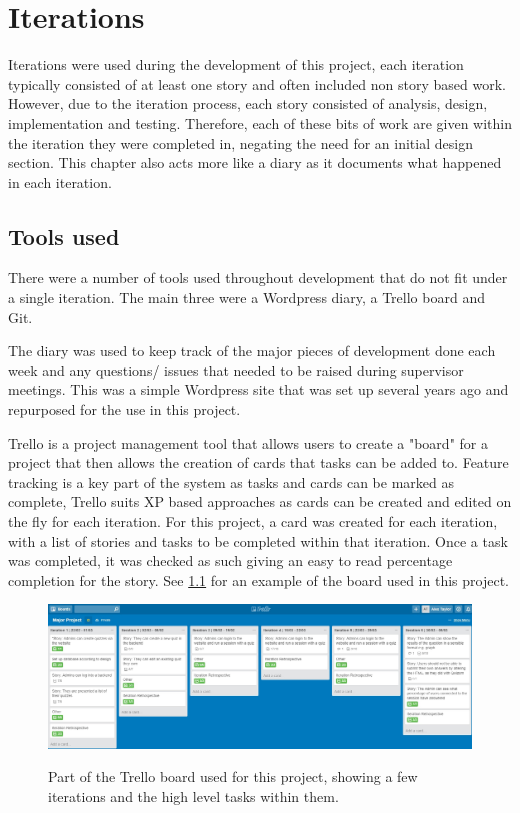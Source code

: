 \chapter{Iterations}
Iterations were used during the development of this project, each iteration typically consisted of at least one story and often included non story based work. However, due to the iteration process, each story consisted of analysis, design, implementation and testing. Therefore, each of these bits of work are given within the iteration they were completed in, negating the need for an initial design section. This chapter also acts more like a diary as it documents what happened in each iteration.

\section{Tools used}
There were a number of tools used throughout development that do not fit under a single iteration. The main three were a Wordpress diary, a Trello board and Git. 

The diary was used to keep track of the major pieces of development done each week and any questions/ issues that needed to be raised during supervisor meetings. This was a simple Wordpress site that was set up several years ago and repurposed for the use in this project.

Trello is a project management tool that allows users to create a "board" for a project that then allows the creation of cards that tasks can be added to\cite{trello}. Feature tracking is a key part of the system as tasks and cards can be marked as complete, Trello suits XP based approaches as cards can be created and edited on the fly for each iteration. For this project, a card was created for each iteration, with a list of stories and tasks to be completed within that iteration. Once a task was completed, it was checked as such giving an easy to read percentage completion for the story. See \ref{fig:trello-board} for an example of the board used in this project.

\begin{figure}
	\caption{Part of the Trello board used for this project, showing a few iterations and the high level tasks within them.}
	\includegraphics[width=\textwidth]{Chapter2/trello-board}
	\label{fig:trello-board}
\end{figure}

